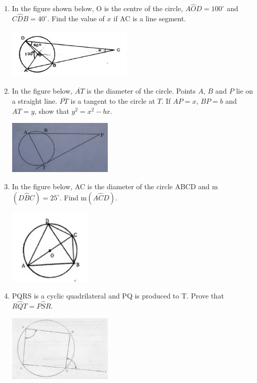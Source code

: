 \begin{enumerate}
	\item In the figure shown below, O is the centre of the circle, $A\hat{O}D = 100^\circ$ and $C\hat{D}B = 40^\circ$. Find the value of $x$ if AC is a line segment.
	\begin{center}
	\includegraphics[width=6cm]{./img/circ11.jpg}
	\end{center}

	\item In the figure below, $\overline{AT}$ is the diameter of the circle. Points $A$, $B$ and $P$ lie on a straight line. $\overline{PT}$ is a tangent to the circle at $T$. If $AP = x$, $BP = b$ and $AT = y$, show that $y^2 = x^2 - bx$.
	\begin{center}
	\includegraphics[width=5cm]{./img/circ12.jpg}
	\end{center}

	\item In the figure below, AC is the diameter of the circle ABCD and m$(D\hat{B}C) = 25^\circ$. Find m$(A\hat{C}D)$.
	\begin{center}
	\includegraphics[width=4cm]{./img/circ13.jpg}
	\end{center}

	\item PQRS is a cyclic quadrilateral and PQ is produced to T. Prove that $R\hat{Q}T = P\hat{S}R$.
	\begin{center}
	\includegraphics[width=5cm]{./img/circ14.jpg}
	\end{center}


\end{enumerate}
